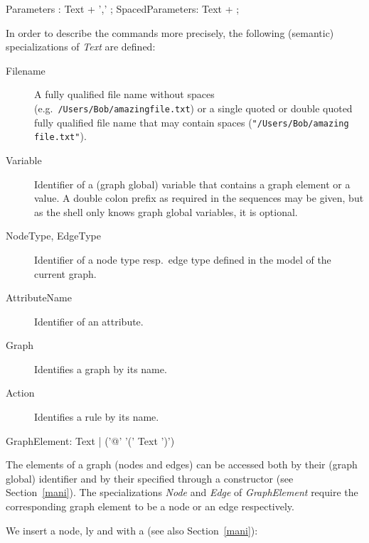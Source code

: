 \begin{rail}
 Parameters : Text + ',' ;
 SpacedParameters: Text + ;
\end{rail}

In order to describe the commands more precisely, the following (semantic) specializations of \emph{Text} are defined:
\begin{description}
  \item[Filename]A fully qualified file name without spaces (e.g.\ \texttt{/Users/Bob/amazing\textunderscore file.txt}) or a single quoted or double quoted fully qualified file name that may contain spaces (\texttt{"/Users/Bob/amazing file.txt"}).
  \item[Variable] Identifier of a (graph global) variable that contains a graph element or a value.  A double colon prefix as required in the sequences may be given, but as the shell only knows graph global variables, it is optional.
  \item[NodeType, EdgeType] Identifier of a node type resp.\ edge type defined in the model of the current graph.
  \item[AttributeName] Identifier of an attribute.
  \item[Graph] Identifies a graph by its name.
  \item[Action] Identifies a rule by its name.
\end{description}
\makeatletter
\begin{rail}
  GraphElement: Text | ('@' '(' Text ')')
\end{rail}
\makeatother

The elements of a graph (nodes and edges) can be accessed both by their (graph global)  identifier and by their  specified through a constructor (see Section~\ref{mani}).
The specializations \emph{Node} and \emph{Edge} of \emph{GraphElement} require the corresponding graph element to be a node or an edge respectively.

\begin{example}
\label{persistentex}
We insert a node, ly and with a  (see also Section~\ref{mani}):
\end{example}

